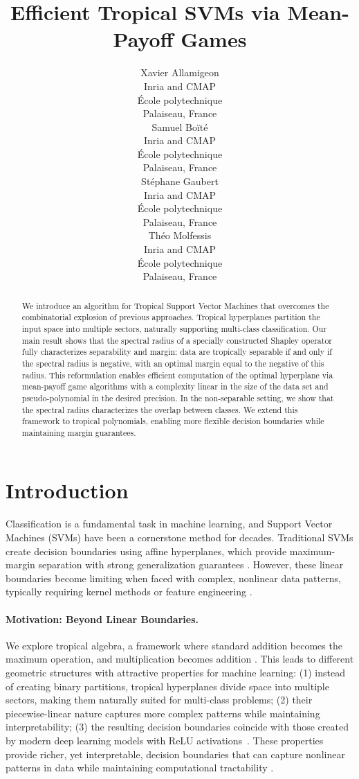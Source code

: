 \documentclass{article}
\title{Efficient Tropical SVMs via Mean-Payoff Games}
\author{
  Xavier Allamigeon \\
  Inria and CMAP \\
  École polytechnique \\
  Palaiseau, France \\
  \And
  Samuel Boïté \\
  Inria and CMAP \\
  École polytechnique \\
  Palaiseau, France \\
  \And
  Stéphane Gaubert \\
  Inria and CMAP \\
  École polytechnique \\
  Palaiseau, France \\
  \And
  Théo Molfessis \\
  Inria and CMAP \\
  École polytechnique \\
  Palaiseau, France \\
}
\begin{document}
\maketitle
{}
\begin{abstract}
We introduce an algorithm for Tropical Support Vector Machines that overcomes the combinatorial explosion of previous approaches. Tropical hyperplanes partition the input space into multiple sectors, naturally supporting multi-class classification. Our main result shows that the spectral radius of a specially constructed Shapley operator fully characterizes separability and margin: data are tropically separable if and only if the spectral radius is negative, with an optimal margin equal to the negative of this radius. This reformulation enables efficient computation of the optimal hyperplane via mean-payoff game algorithms with a complexity linear in the size of the data set and pseudo-polynomial in the desired precision. In the non-separable setting, we show that the spectral radius characterizes the overlap between classes. We extend this framework to tropical polynomials, enabling more flexible decision boundaries while maintaining margin guarantees.
\end{abstract}

\section{Introduction}\label{sec:intro}

Classification is a fundamental task in machine learning, and Support Vector Machines (SVMs) have been a cornerstone method for decades. Traditional SVMs create decision boundaries using affine hyperplanes, which provide maximum-margin separation with strong generalization guarantees \cite{vapnik1999}. However, these linear boundaries become limiting when faced with complex, nonlinear data patterns, typically requiring kernel methods or feature engineering \cite{scholkopf2002}.

\paragraph{Motivation: Beyond Linear Boundaries.} We explore tropical algebra, a framework where standard addition becomes the maximum operation, and multiplication becomes addition \cite{maclagan2015}. This leads to different geometric structures with attractive properties for machine learning: (1) instead of creating binary partitions, tropical hyperplanes divide space into multiple sectors, making them naturally suited for multi-class problems; (2) their piecewise-linear nature captures more complex patterns while maintaining interpretability; (3) the resulting decision boundaries coincide with those created by modern deep learning models with ReLU activations~\cite{zhang2018}. These properties provide richer, yet interpretable, decision boundaries that can capture nonlinear patterns in data while maintaining computational tractability \cite{maragos2021}.
\end{document}
